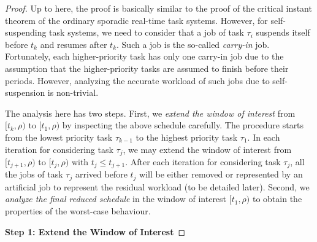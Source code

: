 \begin{proof}
Up to here, the proof is basically similar to the proof of the critical instant theorem of the ordinary sporadic real-time task systems. However, for self-suspending task systems, we need to consider that a job of task $\tau_i$ suspends itself before $t_k$ and resumes after $t_k$. Such a job is the so-called \emph{carry-in} job. Fortunately, each higher-priority task has only one carry-in job due to the assumption that the higher-priority tasks are assumed to finish before their periods. However, analyzing the accurate workload of such jobs due to self-suspension is non-trivial. 

The analysis here has two steps. First, we \emph{extend the window of interest} from $[t_k, \rho)$ to $[t_1, \rho)$ by inspecting the above schedule carefully. The procedure starts from the lowest priority task $\tau_{k-1}$ to the highest priority task $\tau_1$. In each iteration for considering task $\tau_j$, we may extend the window of interest from $[t_{j+1}, \rho)$ to $[t_{j}, \rho)$ with $t_j \leq t_{j+1}$. After each iteration for considering task $\tau_j$, all the jobs of task $\tau_j$ arrived before $t_j$ will be either removed or represented by an artificial job to represent the residual workload (to be detailed later). Second, we \emph{analyze the final reduced schedule} in the window of interest $[t_1, \rho)$ to obtain the properties of the worst-case behaviour.

{\bf Step 1: Extend the Window of Interest} 


\end{proof}
